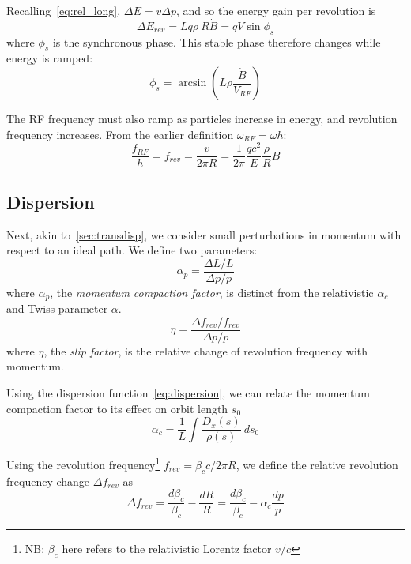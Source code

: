\documentclass[11pt]{report}
\begin{document}
Recalling~\autoref{eq:rel_long}, $\Delta E=v\Delta p$, and so the energy gain per revolution is
\begin{equation}
  \Delta E_{rev} = Lq\rho~R\dot B=qV\sin \phi_s
  \label{eq:ef_sin}
\end{equation} where $\phi_s$ is the synchronous phase. This stable phase therefore changes while energy is ramped:
\begin{equation}
  \phi_s=\arcsin\left(L\rho\frac{\dot B}{V_{RF}}\right)
  \label{eq:sync_phase}
\end{equation}


The RF frequency must also ramp as particles increase in energy, and revolution frequency increases. From the earlier definition $\omega_{RF} = \omega h$:
\begin{equation}
  \frac{f_{RF}}h = f_{rev} = \frac{v}{2\pi R} = \frac 1{2\pi}\frac{qc^2}E\frac\rho R B
\end{equation}


\subsection{Dispersion}

Next, akin to~\autoref{sec:transdisp}, we consider small perturbations in momentum with respect to an ideal path. We define two parameters:
\begin{equation}
  \alpha_p = \frac{\Delta L/L}{\Delta p/p}
\end{equation} where $\alpha_p$, the \textit{momentum compaction factor}, is distinct from the relativistic $\alpha_c$ and Twiss parameter $\alpha$.
\begin{equation}
  \eta = \frac{\Delta f_{rev}/f_{rev}}{\Delta p/p}
\end{equation} where $\eta$, the \textit{slip factor}, is the relative change of revolution frequency with momentum.

Using the dispersion function~\autoref{eq:dispersion}, we can relate the momentum compaction factor to its effect on orbit length $s_0$~\cite[5.1]{lbd:tecker}
\begin{equation}
  \alpha_c=\frac 1L\int\frac{D_x(s)}{\rho(s)}\ ds_0
\end{equation}

Using the revolution frequency\footnote{NB: $\beta_c$ here refers to the relativistic Lorentz factor $v/c$ } $f_{rev}=\beta_c c/2\pi R$, we define the relative revolution frequency change $\Delta f_{rev}$ as
\begin{equation}
  \Delta f_{rev} = \frac{d\beta_c}{\beta_c}-\frac{dR}R=\frac{d\beta_c}{\beta_c}-\alpha_c\frac{dp}p
\end{equation} 
\end{document}
